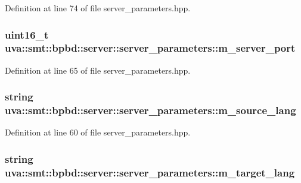 Definition at line 74 of file server\+\_\+parameters.\+hpp.

\hypertarget{structuva_1_1smt_1_1bpbd_1_1server_1_1server__parameters_a0a5f681cdd40ad5962206174c692bce0}{}
\subsubsection[{m\+\_\+server\+\_\+port}]{\setlength{\rightskip}{0pt plus 5cm}uint16\+\_\+t uva\+::smt\+::bpbd\+::server\+::server\+\_\+parameters\+::m\+\_\+server\+\_\+port}\label{structuva_1_1smt_1_1bpbd_1_1server_1_1server__parameters_a0a5f681cdd40ad5962206174c692bce0}


Definition at line 65 of file server\+\_\+parameters.\+hpp.

\hypertarget{structuva_1_1smt_1_1bpbd_1_1server_1_1server__parameters_ac516b94082ea54b54477a5ed52e6dcfa}{}
\subsubsection[{m\+\_\+source\+\_\+lang}]{\setlength{\rightskip}{0pt plus 5cm}string uva\+::smt\+::bpbd\+::server\+::server\+\_\+parameters\+::m\+\_\+source\+\_\+lang}\label{structuva_1_1smt_1_1bpbd_1_1server_1_1server__parameters_ac516b94082ea54b54477a5ed52e6dcfa}


Definition at line 60 of file server\+\_\+parameters.\+hpp.

\hypertarget{structuva_1_1smt_1_1bpbd_1_1server_1_1server__parameters_a4db4133ba3f0564deae864d1598b2019}{}
\subsubsection[{m\+\_\+target\+\_\+lang}]{\setlength{\rightskip}{0pt plus 5cm}string uva\+::smt\+::bpbd\+::server\+::server\+\_\+parameters\+::m\+\_\+target\+\_\+lang}\label{structuva_1_1smt_1_1bpbd_1_1server_1_1server__parameters_a4db4133ba3f0564deae864d1598b2019}



